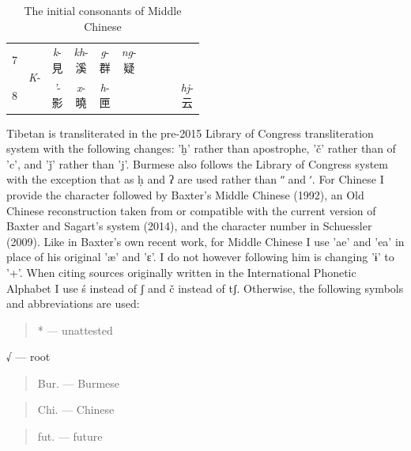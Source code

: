 \begin{table}[bp]
\begin{tabular}{|c|c|c|c|c|c|c|c|c|c|}
         7& \multirow{2}{*}{\textit{K}-}& \makecell[l]{\textit{k}-\\見} & \makecell[l]{\textit{kh}-\\溪}  & \makecell[l]{\textit{g}-\\群} & \makecell[l]{\textit{ng}-\\疑} &  &  &  & \\ \cline{1-1} \cline{3-10} 
         8&  & \makecell[l]{\textit{'}-\\影} & \makecell[l]{\textit{x}-\\曉} & \makecell[l]{\textit{h}-\\匣} &  &  &  &  & \makecell[l]{\textit{hj}-\\云} \\ \hline
    \end{tabular}
    \caption{The initial consonants of Middle Chinese}
    \label{tab:MC_initials}
\end{table}



Tibetan is transliterated in the pre-2015 Library of Congress
transliteration system with the following changes: 'ḫ' rather than
apostrophe, 'č' rather than of 'c', and 'ǰ' rather than 'j'. Burmese
also follows the Library of Congress system with the exception that as ḥ
and ʔ are used rather than ʺ and ʹ. For Chinese I provide the character
followed by Baxter's Middle Chinese (1992), an Old Chinese
reconstruction taken from or compatible with the current version of
Baxter and Sagart's system (2014), and the character number in
Schuessler (2009). Like in Baxter's own recent work, for Middle Chinese
I use 'ae' and 'ea' in place of his original 'æ' and 'ɛ'. I do not
however following him is changing 'ɨ' to '+'. When citing sources
originally written in the International Phonetic Alphabet I use ś
instead of ʃ and č instead of tʃ. Otherwise, the following symbols and
abbreviations are used:

\begin{quote}
* --- unattested
\end{quote}

√ --- root

\begin{quote}
Bur. --- Burmese
\end{quote}

\begin{quote}
Chi. --- Chinese
\end{quote}

\begin{quote}
fut. --- future
\end{quote}

